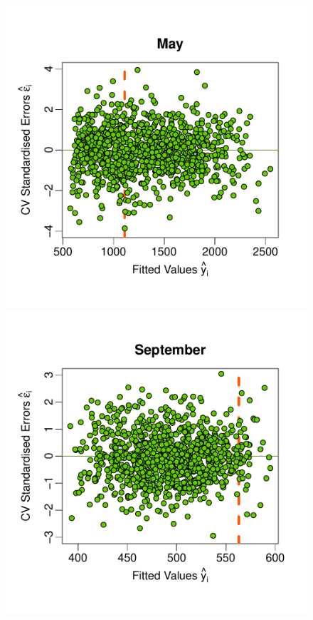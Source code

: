 \documentclass[a4paper, 12pt]{article}
\begin{document}
\begin{figure}
 \includegraphics[width=\scale]{Emulator_CV/ScatterPlots/May_CV_Scatter}\hspace{-1ex}
 \includegraphics[width=\scale]{Emulator_CV/ScatterPlots/September_CV_Scatter}\\[-3ex]

\end{figure}
\end{document}
